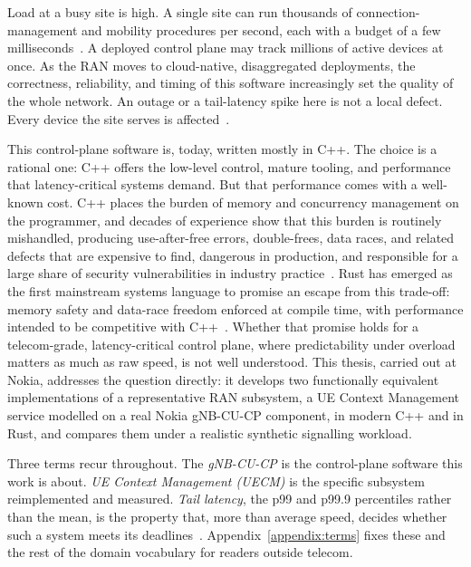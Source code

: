 \documentclass[english,oneside,a4paper,censored,csm,software-track-2020]{HYthesisML}
\begin{document}
Load at a busy site is high. A single site can run thousands of connection-management and
mobility procedures per second, each with a budget of a few
milliseconds~\cite{3gpp38913}. A deployed control plane may track millions of active
devices at once. As the RAN moves to cloud-native, disaggregated deployments, the
correctness, reliability, and timing of this software increasingly set the quality of the
whole network. An outage or a tail-latency spike here is not a local defect. Every device
the site serves is affected~\cite{dean2013tail,barroso2017microseconds}.

This control-plane software is, today, written mostly in C++. The choice is a
rational one: C++ offers the low-level control, mature tooling, and performance that
latency-critical systems demand. But that performance comes with a well-known cost. C++
places the burden of memory and concurrency management on the programmer, and decades of
experience show that this burden is routinely mishandled, producing use-after-free errors,
double-frees, data races, and related defects that are expensive to find, dangerous in
production, and responsible for a large share of security vulnerabilities in industry
practice~\cite{msrc2019memory,google2022android}. Rust has emerged as the first mainstream
systems language to promise an escape from this trade-off: memory safety and data-race
freedom enforced at compile time, with performance intended to be competitive with
C++~\cite{klabnik2023rust,jung2018rustbelt}. Whether that promise holds for a
telecom-grade, latency-critical control plane, where predictability under overload matters
as much as raw speed, is not well understood. This thesis, carried out at Nokia, addresses
the question directly: it develops two functionally equivalent implementations of a
representative RAN subsystem, a UE Context Management service modelled on a real Nokia
gNB-CU-CP component, in modern C++ and in Rust, and compares them under a realistic
synthetic signalling workload.

Three terms recur throughout. The \emph{gNB-CU-CP} is the control-plane software this work is
about. \emph{UE Context Management (UECM)} is the specific subsystem reimplemented and measured.
\emph{Tail latency}, the p99 and p99.9 percentiles rather than the mean, is the property that,
more than average speed, decides whether such a system meets its
deadlines~\cite{dean2013tail,barroso2017microseconds}. Appendix~\ref{appendix:terms} fixes these
and the rest of the domain vocabulary for readers outside telecom.
\end{document}

